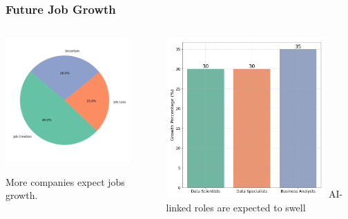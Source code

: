 \documentclass{beamer}
\begin{document}
    \begin{frame}
        \frametitle{Future Job Growth}
        \begin{columns}
            \begin{column}{0.5\textwidth}
                \includegraphics[width=0.85\textwidth]{ai_impact_on_jobs_pie.png}
                
                More companies expect jobs growth.
            \end{column}
            \begin{column}{0.5\textwidth}
                \includegraphics[width=0.85\textwidth]{ai_linked_roles_growth.png}
                AI-linked roles are expected to swell
            \end{column}
        \end{columns}
    \end{frame}
\end{document}
